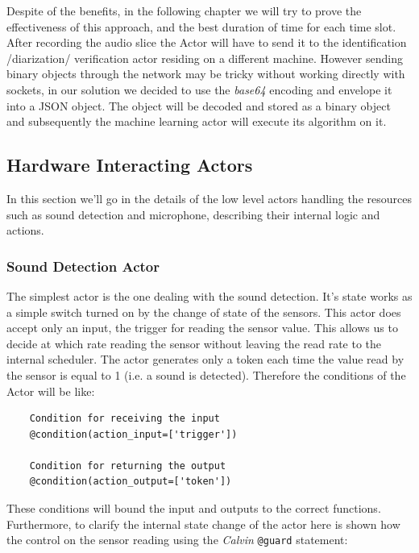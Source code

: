 Despite of the benefits, in the following chapter we will try to prove the effectiveness of this approach,
and the best duration of time for each time slot.\newline
After recording the audio slice the Actor will have to send it to the identification /diarization/ verification
actor residing on a different machine. However sending binary objects through the network
may be tricky without working directly with sockets, in our solution we decided to
use the \textit{base64} encoding and envelope it into a JSON object. The object will be decoded
and stored as a binary object and subsequently the machine learning actor will execute
its algorithm on it.

\subsection{Hardware Interacting Actors}

In this section we'll go in the details of the low level actors handling the resources
such as sound detection and microphone, describing their internal logic and actions.

\subsubsection{Sound Detection Actor}

The simplest actor is the one dealing with the sound detection. It's state works
as a simple switch turned on by the change of state of the sensors. This actor does
accept only an input, the trigger for reading the sensor value. This allows us to
decide at which rate reading the sensor without leaving the read rate to the internal
scheduler. The actor generates only a token each time the value read by the
sensor is equal to 1 (i.e. a sound is detected). Therefore the conditions
of the Actor will be like:

\begin{verbatim}
    Condition for receiving the input
    @condition(action_input=['trigger'])

    Condition for returning the output
    @condition(action_output=['token'])

\end{verbatim}
 These conditions will bound the input and outputs to the correct functions.
 Furthermore, to clarify the internal state change of the actor here is shown
 how the control on the sensor reading using the \textit{Calvin} \texttt{@guard}
 statement:

